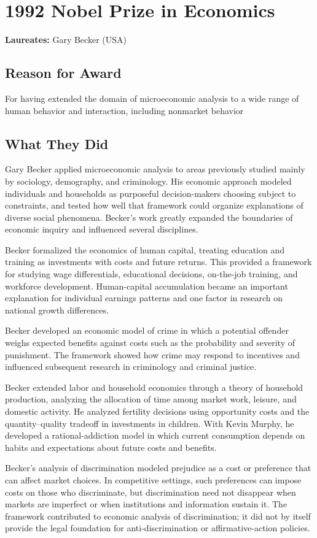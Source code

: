 \chapter{1992 Nobel Prize in Economics}
\textbf{Laureates: }Gary Becker (USA)

\section*{Reason for Award}
For having extended the domain of microeconomic analysis to a wide range of
human behavior and interaction, including nonmarket behavior

\section{What They Did}
Gary Becker applied microeconomic analysis to areas previously studied mainly
by sociology, demography, and criminology. His economic approach modeled
individuals and households as purposeful decision-makers choosing subject to
constraints, and tested how well that framework could organize explanations of
diverse social phenomena. Becker's work greatly expanded the boundaries of
economic inquiry and influenced several disciplines.

Becker formalized the economics of human capital, treating education and
training as investments with costs and future returns. This provided a
framework for studying wage differentials, educational decisions, on-the-job
training, and workforce development. Human-capital accumulation became an
important explanation for individual earnings patterns and one factor in
research on national growth differences.

Becker developed an economic model of crime in which a potential offender
weighs expected benefits against costs such as the probability and severity of
punishment. The framework showed how crime may respond to incentives and
influenced subsequent research in criminology and criminal justice.

Becker extended labor and household economics through a theory of household
production, analyzing the allocation of time among market work, leisure, and
domestic activity. He analyzed fertility decisions using opportunity costs and
the quantity--quality tradeoff in investments in children. With Kevin Murphy,
he developed a rational-addiction model in which current consumption depends
on habits and expectations about future costs and benefits.

Becker's analysis of discrimination modeled prejudice as a cost or preference
that can affect market choices. In competitive settings, such preferences can
impose costs on those who discriminate, but discrimination need not disappear
when markets are imperfect or when institutions and information sustain it.
The framework contributed to economic analysis of discrimination; it did not by
itself provide the legal foundation for anti-discrimination or affirmative-action
policies.

